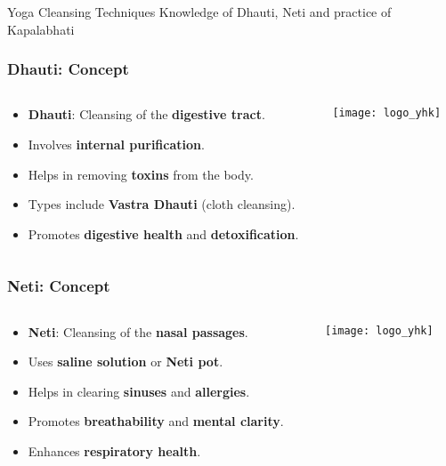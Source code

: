 \begin{frame}[fragile]\frametitle{}
\begin{center}
{\Large Yoga Cleansing Techniques Knowledge of Dhauti, Neti and practice of Kapalabhati}
\end{center}
\end{frame}

\begin{frame}[fragile]\frametitle{Dhauti: Concept}
\begin{columns}
    \begin{column}[T]{0.5\linewidth}
      \begin{itemize}
        \item \textbf{Dhauti}: Cleansing of the \textbf{digestive tract}.
        \item Involves \textbf{internal purification}.
        \item Helps in removing \textbf{toxins} from the body.
        \item Types include \textbf{Vastra Dhauti} (cloth cleansing).
        \item Promotes \textbf{digestive health} and \textbf{detoxification}.
      \end{itemize}
    \end{column}
    \begin{column}[T]{0.5\linewidth}
        \begin{center}
        \texttt{[image: logo\_yhk]}
        \end{center}	
    \end{column}
\end{columns}
\end{frame}

\begin{frame}[fragile]\frametitle{Neti: Concept}
\begin{columns}
    \begin{column}[T]{0.5\linewidth}
      \begin{itemize}
        \item \textbf{Neti}: Cleansing of the \textbf{nasal passages}.
        \item Uses \textbf{saline solution} or \textbf{Neti pot}.
        \item Helps in clearing \textbf{sinuses} and \textbf{allergies}.
        \item Promotes \textbf{breathability} and \textbf{mental clarity}.
        \item Enhances \textbf{respiratory health}.
      \end{itemize}
    \end{column}
    \begin{column}[T]{0.5\linewidth}
        \begin{center}
        \texttt{[image: logo\_yhk]}
        \end{center}	
    \end{column}
\end{columns}
\end{frame}

